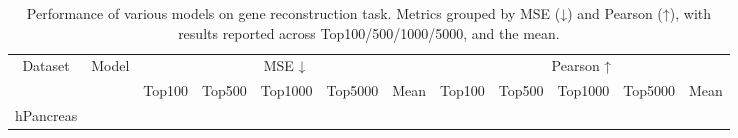 \begin{table}[htbp]

  \centering

  \renewcommand\arraystretch{1.1}

  \scriptsize

  \caption{Performance of various models on gene reconstruction task. Metrics grouped by MSE (↓) and Pearson (↑), with results reported across Top100/500/1000/5000, and the mean.}

  \label{tab:topk_grouped_metric}

  \setlength{\tabcolsep}{4pt}

  \begin{tabular}{cl|ccccc|ccccc}

    \toprule
    \multirow{2}{*}{Dataset} & \multirow{2}{*}{Model}
      & \multicolumn{5}{c|}{MSE ↓}
      & \multicolumn{5}{c}{Pearson ↑} \\
    \cmidrule(lr){3-7} \cmidrule(lr){8-12}
     & & Top100 & Top500 & Top1000 & Top5000 & Mean
       & Top100 & Top500 & Top1000 & Top5000 & Mean \\
    \midrule

    \multirow{9}{*}{hPancreas}


\end{tabular}
\end{table}
